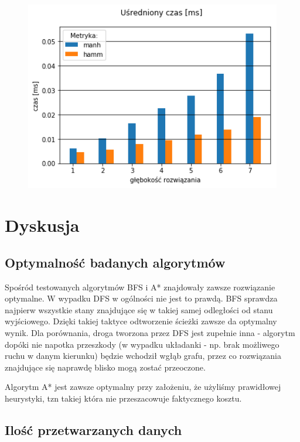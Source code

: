 \documentclass{classrep}
\begin{document}
\begin{figure}[H]
  \centering
  \begin{minipage}{0.45\textwidth}
    \centering
    \includegraphics[width=1.1\textwidth]{output_4_4.png}
  \end{minipage}
\end{figure}

\restoregeometry

\section{Dyskusja}
\subsection{Optymalność badanych algorytmów}

Spośród testowanych algorytmów BFS i A* znajdowały zawsze rozwiązanie optymalne. W wypadku DFS w ogólności nie
jest to prawdą. BFS sprawdza najpierw wszystkie stany znajdujące się w takiej samej odległości od stanu
wyjściowego. Dzięki takiej taktyce odtworzenie ścieżki zawsze da optymalny wynik. Dla porównania, droga
tworzona przez DFS jest zupełnie inna - algorytm dopóki nie napotka przeszkody (w wypadku układanki - np. brak
możliwego ruchu w danym kierunku) będzie wchodził wgłąb grafu, przez co rozwiązania znajdujące się naprawdę
blisko mogą zostać przeoczone.

Algorytm A* jest zawsze optymalny przy założeniu, że użyliśmy prawidłowej heurystyki, tzn takiej która nie
przeszacowuje faktycznego kosztu.

\subsection{Ilość przetwarzanych danych}
\end{document}
